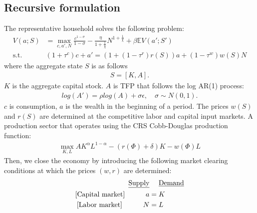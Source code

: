 \subsection*{Recursive formulation}
The representative household solves the following problem:
\begin{align*}
  V(a;S) &= \max_{c,a',N} \frac{c^{1-\sigma}}{1-\sigma} - 
  \frac{\eta}{1+\frac{1}{\chi}}N^{1+\frac{1}{\chi}}+ \beta \mathbb{E}V(a';S')
  \\
  \text{s.t. }& 
  (1+\tau^{c})c+a' = (1+(1-\tau^{r})r(S))a + (1-\tau^{w})w(S)N
\end{align*}
where the aggregate state $S$ is as follows
\begin{align*}
  S = [K,A].
\end{align*}
$K$ is the aggregate capital stock. $A$ is TFP that follows the log AR(1) process:
\begin{align*}
  log(A') = \rho log(A) + \sigma\epsilon,\quad\sigma\sim N(0,1).
\end{align*}
$c$ is consumption, $a$ is the wealth in the beginning of a period. %
The prices $w(S)$ and $r(S)$ are determined at the competitive labor and capital input markets.
A production sector that operates using the CRS Cobb-Douglas production function:
\begin{align*}
	\max_{K,L} A K^{\alpha}L^{1-\alpha} - (r(\Phi)+\delta)K - w(\Phi)L
\end{align*}
Then, we close the economy by introducing the following market clearing conditions at which the prices $(w,r)$ are determined:
\begin{align*}
	\text{\underline{Supply}}&\quad\text{ \underline{Demand}}
	\\
	\text{[Capital market]}\quad\qquad  a &= K
	\\
	\text{[Labor market]}\quad\qquad N &= L
\end{align*}

